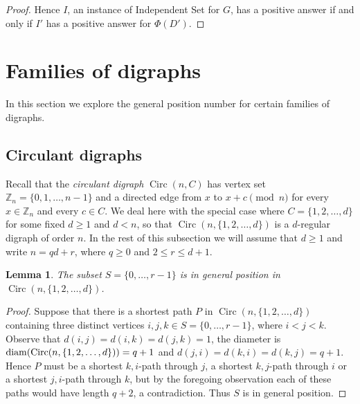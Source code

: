 \documentclass[a4paper,12pt]{article}
\newtheorem{lemma}[theorem]{Lemma}
\theoremstyle{definition}
\newcommand{\IS}{{\sc Independent Set}\xspace}
\newcommand{\diam}{{\rm diam}}
\DeclareMathOperator{\Circ}{Circ}
\newcommand{\Z}{\mathbb{Z}}
\begin{document}
\begin{proof}
		Hence $I$, an instance of \IS for $G$, has a positive answer if and only if $I'$ has a positive answer for $\Phi (D')$.
	\end{proof}
	
	
	\section{Families of digraphs}\label{sec:families}
	
	In this section we explore the general position number for certain families of digraphs. 
	
	\subsection{Circulant digraphs}
	Recall that the \emph{circulant digraph} $\Circ(n,C)$ has vertex set $\Z_n=\{0,1,\ldots,n-1\}$ and a directed edge from $x$ to $x+c\pmod{n}$ for every $x\in\Z_n$ and every $c\in C$. We deal here with the special case where $C=\{1,2,\ldots,d\}$ for some fixed $d\geq 1$ and $d < n$, so that $\Circ(n,\{1,2,\ldots,d\})$ is a $d$-regular digraph of order $n$. In the rest of this subsection we will assume that $d \geq 1$ and write $n = qd+r$, where $q \geq 0$ and $2 \leq r \leq d+1$. 
	
	\begin{lemma}\label{lem:gpcirc}
		The subset $S = \{ 0,\ldots ,r-1\} $ is in general position in $\Circ(n,\{1,2,\ldots,d\})$.
	\end{lemma}
	\begin{proof}
		Suppose that there is a shortest path $P$ in $\Circ(n,\{1,2,\ldots,d\})$ containing three distinct vertices $i,j,k \in S = \{ 0,\ldots ,r-1\} $, where $i < j < k$. Observe that $d(i,j) = d(i,k) = d(j,k) = 1$, the diameter is $\diam ( \Circ(n,\{1,2,\ldots,d\}) ) = q+1$ and $d(j,i) = d(k,i) = d(k,j) = q+1$. Hence $P$ must be a shortest $k,i$-path through $j$, a shortest $k,j$-path through $i$ or a shortest $j,i$-path through $k$, but by the foregoing observation each of these paths would have length $q+2$, a contradiction. Thus $S$ is in general position.
	\end{proof}
	
\end{document}
